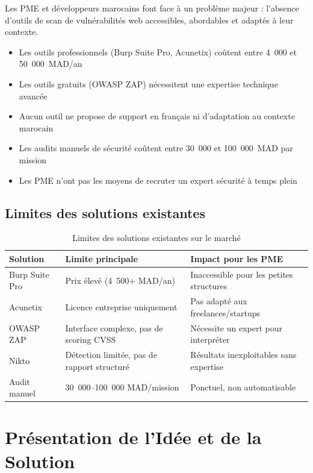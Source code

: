 \documentclass[12pt,a4paper]{report}
\newcommand{\hdr}[1]{\cellcolor{gray!15}\textbf{#1}}
\newcommand{\rowA}{\rowcolor{gray!8}}
\begin{document}
Les PME et développeurs marocains font face à un problème majeur : l'absence d'outils de scan de vulnérabilités web accessibles, abordables et adaptés à leur contexte.

\begin{itemize}
  \item Les outils professionnels (Burp Suite Pro, Acunetix) coûtent entre 4~000 et 50~000~MAD/an
  \item Les outils gratuits (OWASP ZAP) nécessitent une expertise technique avancée
  \item Aucun outil ne propose de support en français ni d'adaptation au contexte marocain
  \item Les audits manuels de sécurité coûtent entre 30~000 et 100~000~MAD par mission
  \item Les PME n'ont pas les moyens de recruter un expert sécurité à temps plein
\end{itemize}

\subsection{Limites des solutions existantes}

\begin{table}[H]
\centering
\caption{Limites des solutions existantes sur le marché}
\begin{tabular}{p{3cm}p{4cm}p{5cm}}
\toprule
\hdr{Solution} & \hdr{Limite principale} & \hdr{Impact pour les PME} \\
\midrule
Burp Suite Pro & Prix élevé (4~500+ MAD/an) & Inaccessible pour les petites structures \\
\rowA Acunetix & Licence entreprise uniquement & Pas adapté aux freelances/startups \\
OWASP ZAP & Interface complexe, pas de scoring CVSS & Nécessite un expert pour interpréter \\
\rowA Nikto & Détection limitée, pas de rapport structuré & Résultats inexploitables sans expertise \\
Audit manuel & 30~000--100~000 MAD/mission & Ponctuel, non automatisable \\
\bottomrule
\end{tabular}
\end{table}

\section{Présentation de l'Idée et de la Solution}
\end{document}
